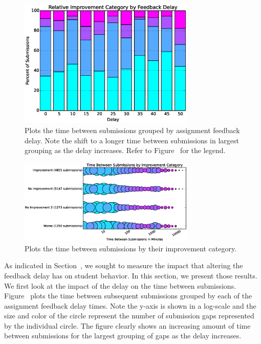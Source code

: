 \begin{figure}[!t]
\centering \includegraphics[width=3.3in]{graphs/Relative_Improvement_Category_by_Feedback_Delay.eps}
\caption{Plots the time between submissions grouped by assignment feedback
  delay. Note the shift to a longer time between submissions in largest
  grouping as the delay increases. Refer to
  Figure~ for the legend.}
\end{figure}

\begin{figure}[!t]
\centering \includegraphics[width=3.3in]{graphs/Time_Between_Submissions_by_Improvement_Category.eps}
\caption{Plots the time between submissions by their improvement category.}
\end{figure}

As indicated in Section~, we sought to measure the impact
that altering the feedback delay has on student behavior. In this section, we
present those results. We first look at the impact of the delay on the time
between submissions. Figure~ plots the time between
subsequent submissions grouped by each of the assignment feedback delay
times. Note the y-axis is shown in a log-scale and the size and color of the
circle represent the number of submission gaps represented by the individual
circle. The figure clearly shows an increasing amount of time between
submissions for the largest grouping of gaps as the delay increases.

